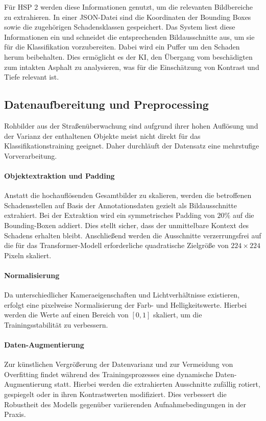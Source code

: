 Für HSP 2 werden diese Informationen genutzt, um die relevanten Bildbereiche zu extrahieren. In einer JSON-Datei sind die Koordinaten der Bounding Boxes sowie die zugehörigen Schadensklassen gespeichert. Das System liest diese Informationen ein und schneidet die entsprechenden Bildausschnitte aus, um sie für die Klassifikation vorzubereiten. Dabei wird ein Puffer um den Schaden herum beibehalten. Dies ermöglicht es der KI, den Übergang vom beschädigten zum intakten Asphalt zu analysieren, was für die Einschätzung von Kontrast und Tiefe relevant ist.

\subsection{Datenaufbereitung und Preprocessing}
\label{subsec:preprocessing}

Rohbilder aus der Straßenüberwachung sind aufgrund ihrer hohen Auflösung und der Varianz der enthaltenen Objekte meist nicht direkt für das Klassifikationstraining geeignet. Daher durchläuft der Datensatz eine mehrstufige Vorverarbeitung.

\paragraph{Objektextraktion und Padding}
Anstatt die hochauflösenden Gesamtbilder zu skalieren, werden die betroffenen Schadensstellen auf Basis der Annotationsdaten gezielt als Bildausschnitte  extrahiert. Bei der Extraktion wird ein symmetrisches Padding von $20\%$ auf die Bounding-Boxen addiert. Dies stellt sicher, dass der unmittelbare Kontext des Schadens erhalten bleibt. Anschließend werden die Ausschnitte verzerrungsfrei auf die für das Transformer-Modell erforderliche quadratische Zielgröße von $224 \times 224$ Pixeln skaliert.

\paragraph{Normalisierung}
Da unterschiedlicher Kameraeigenschaften und Lichtverhältnisse existieren, erfolgt eine pixelweise Normalisierung der Farb- und Helligkeitswerte. Hierbei werden die Werte auf einen Bereich von $[0, 1]$ skaliert, um die Trainingsstabilität zu verbessern.

\paragraph{Daten-Augmentierung}
Zur künstlichen Vergrößerung der Datenvarianz und zur Vermeidung von Overfitting findet während des Trainingsprozesses eine dynamische Daten-Augmentierung statt. Hierbei werden die extrahierten Ausschnitte zufällig rotiert, gespiegelt oder in ihren Kontrastwerten modifiziert. Dies verbessert die Robustheit des Modells gegenüber variierenden Aufnahmebedingungen in der Praxis.


